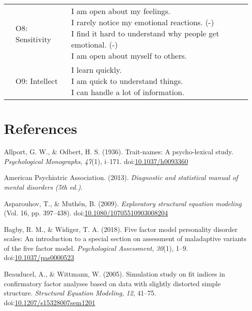 \documentclass[,man,floatsintext]{apa6}
\theoremstyle{definition}
\theoremstyle{definition}
\theoremstyle{definition}
\theoremstyle{remark}
\begin{document}
\begin{longtable}[t]{lll}
\addlinespace
 & O8: Sensitivity & \makecell[l]{I am open about my feelings.\\I rarely notice my emotional reactions. (-)\\I find it hard to understand why people get emotional. (-)\\I am open about myself to others.}\\
\addlinespace
 & O9: Intellect & \makecell[l]{I learn quickly.\\I am quick to understand things.\\I can handle a lot of information.}\\*
\end{longtable}

\hypertarget{references}{%
\section{References}\label{references}}

\begingroup
\setlength{\parindent}{-0.5in}
\setlength{\leftskip}{0.5in}

\hypertarget{refs}{}
\leavevmode\hypertarget{ref-AllportOdbert1936}{}%
Allport, G. W., \& Odbert, H. S. (1936). Trait-names: A psycho-lexical
study. \emph{Psychological Monographs}, \emph{47}(1), i--171.
doi:\href{https://doi.org/10.1037/h0093360}{10.1037/h0093360}

\leavevmode\hypertarget{ref-APA2013}{}%
American Psychiatric Association. (2013). \emph{Diagnostic and
statistical manual of mental disorders (5th ed.)}.

\leavevmode\hypertarget{ref-AsparouhovMuthen2009}{}%
Asparouhov, T., \& Muthén, B. (2009). \emph{Exploratory structural
equation modeling} (Vol. 16, pp. 397--438).
doi:\href{https://doi.org/10.1080/10705510903008204}{10.1080/10705510903008204}

\leavevmode\hypertarget{ref-Bagby2018}{}%
Bagby, R. M., \& Widiger, T. A. (2018). Five factor model personality
disorder scales: An introduction to a special section on assessment of
maladaptive variants of the five factor model. \emph{Psychological
Assessment}, \emph{30}(1), 1--9.
doi:\href{https://doi.org/10.1037/pas0000523}{10.1037/pas0000523}

\leavevmode\hypertarget{ref-Beauducel2005}{}%
Beauducel, A., \& Wittmann, W. (2005). Simulation study on fit indices
in confirmatory factor analyses based on data with slightly distorted
simple structure. \emph{Structural Equation Modeling}, \emph{12},
41--75.
doi:\href{https://doi.org/10.1207/s15328007sem1201}{10.1207/s15328007sem1201}
\end{document}
